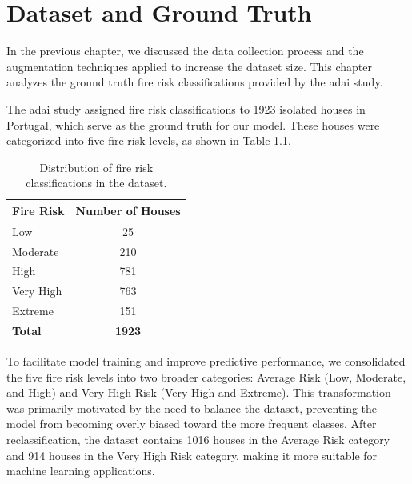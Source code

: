 \chapter{Dataset and Ground Truth}
\label{cha:dataset-groundtruth}

In the previous chapter, we discussed the data collection process and the augmentation 
techniques applied to increase the dataset size. This chapter analyzes the ground truth 
fire risk classifications provided by the \gls{adai} study.

The \gls{adai} study assigned fire risk classifications to 1923 isolated houses in Portugal, 
which serve as the ground truth for our model. These houses were categorized into five 
fire risk levels, as shown in Table \ref{fig:data-distribution}.

\begin{table}[ht]
    \centering
    \renewcommand{\arraystretch}{1.2} %
    \setlength{\tabcolsep}{12pt} %
    \begin{tabular}{lc}
        \toprule
        \textbf{Fire Risk} & \textbf{Number of Houses} \\ 
        \midrule
        Low                &  25   \\ 
        Moderate           &  210  \\ 
        High               &  781  \\ 
        Very High          &  763  \\ 
        Extreme            &  151  \\ 
        \midrule
        \textbf{Total}     & \textbf{1923} \\ 
        \bottomrule
    \end{tabular}
    \caption{Distribution of fire risk classifications in the dataset.}
    \label{fig:data-distribution}
\end{table}

To facilitate model training and improve predictive performance, we consolidated 
the five fire risk levels into two broader categories: Average Risk (Low, Moderate, 
and High) and Very High Risk (Very High and Extreme). This transformation was 
primarily motivated by the need to balance the dataset, preventing the model from 
becoming overly biased toward the more frequent classes. After reclassification, the 
dataset contains 1016 houses in the Average Risk category and 914 houses in 
the Very High Risk category, making it more suitable for machine learning applications.

